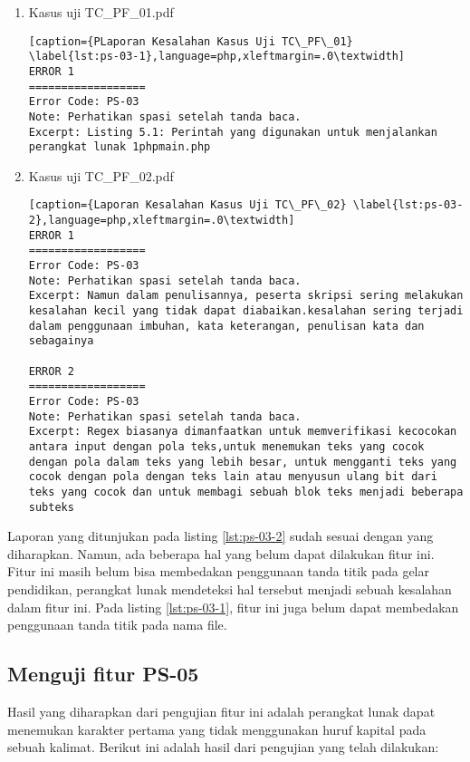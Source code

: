 \begin{enumerate}
	\item Kasus uji TC\_PF\_01.pdf
	
\begin{lstlisting}[caption={PLaporan Kesalahan Kasus Uji TC\_PF\_01}	\label{lst:ps-03-1},language=php,xleftmargin=.0\textwidth]
ERROR 1
==================
Error Code: PS-03
Note: Perhatikan spasi setelah tanda baca.
Excerpt: Listing 5.1: Perintah yang digunakan untuk menjalankan perangkat lunak 1phpmain.php
\end{lstlisting}
	
	\item Kasus uji TC\_PF\_02.pdf
	
\begin{lstlisting}[caption={Laporan Kesalahan Kasus Uji TC\_PF\_02}	\label{lst:ps-03-2},language=php,xleftmargin=.0\textwidth]
ERROR 1
==================
Error Code: PS-03
Note: Perhatikan spasi setelah tanda baca.
Excerpt: Namun dalam penulisannya, peserta skripsi sering melakukan kesalahan kecil yang tidak dapat diabaikan.kesalahan sering terjadi dalam penggunaan imbuhan, kata keterangan, penulisan kata dan sebagainya

ERROR 2
==================
Error Code: PS-03
Note: Perhatikan spasi setelah tanda baca.
Excerpt: Regex biasanya dimanfaatkan untuk memverifikasi kecocokan antara input dengan pola teks,untuk menemukan teks yang cocok dengan pola dalam teks yang lebih besar, untuk mengganti teks yang cocok dengan pola dengan teks lain atau menyusun ulang bit dari teks yang cocok dan untuk membagi sebuah blok teks menjadi beberapa subteks
\end{lstlisting}
\end{enumerate}

Laporan yang ditunjukan pada listing \ref{lst:ps-03-2} sudah sesuai dengan yang diharapkan. Namun, ada beberapa hal yang belum dapat dilakukan fitur ini. Fitur ini masih belum bisa membedakan penggunaan tanda titik pada gelar pendidikan, perangkat lunak mendeteksi hal tersebut menjadi sebuah kesalahan dalam fitur ini. Pada listing \ref{lst:ps-03-1}, fitur ini juga belum dapat membedakan penggunaan tanda titik pada nama file.

\subsection{Menguji fitur PS-05}
Hasil yang diharapkan dari pengujian fitur ini adalah perangkat lunak dapat menemukan karakter pertama yang tidak menggunakan huruf kapital pada sebuah kalimat. Berikut ini adalah hasil dari pengujian yang telah dilakukan:


